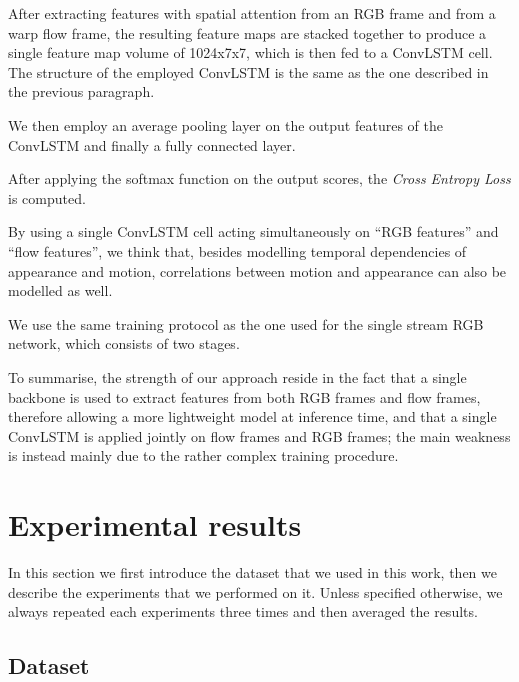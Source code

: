 \documentclass[10pt,twocolumn,letterpaper]{article}
\begin{document}
After extracting features with spatial attention from an RGB frame and from a warp flow frame, the resulting feature maps are stacked together to produce a single feature map volume of 1024x7x7, which is then fed to a ConvLSTM cell. The structure of the employed ConvLSTM is the same as the one described in the previous paragraph.

We then employ an average pooling layer on the output features of the ConvLSTM and finally a fully connected layer.

After applying the softmax function on the output scores, the \textit{Cross Entropy Loss} is computed.

By using a single ConvLSTM cell acting simultaneously on ``RGB features'' and ``flow features'', we think that, besides modelling temporal dependencies of appearance and motion, correlations between motion and appearance can also be modelled as well.

We use the same training protocol as the one used for the single stream RGB network, which consists of two stages.

To summarise, the strength of our approach reside in the fact that a single backbone is used to extract features from both RGB frames and flow frames, therefore allowing a more lightweight model at inference time, and that a single ConvLSTM is applied jointly on flow frames and RGB frames; the main weakness is instead mainly due to the rather complex training procedure.

\section{Experimental results}

In this section we first introduce the dataset that we used in this work, then we describe the experiments that we performed on it. Unless specified otherwise, we always repeated each experiments three times and then averaged the results.

\subsection{Dataset}
\end{document}
